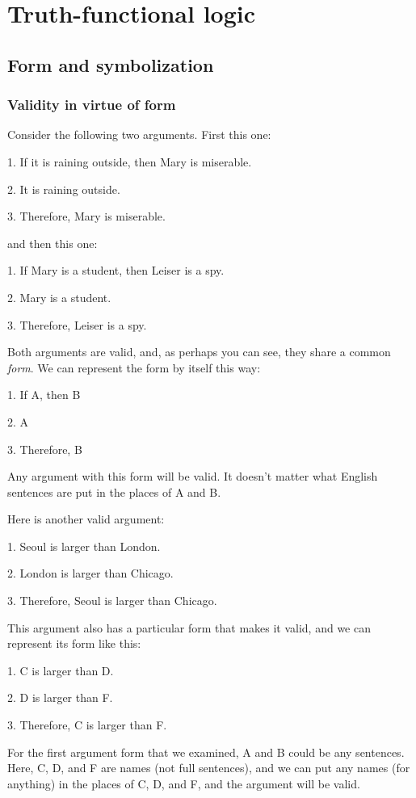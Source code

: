 \part{Truth-functional logic}
\label{ch.TFL}

\chapter{Form and symbolization}\label{symbolization}

\section{Validity in virtue of form}\label{s:ValidityInVirtueOfForm}
Consider the following two arguments. First this one:
	\begin{earg}
		\item[1.] If it is raining outside, then Mary is miserable.
		\item[2.] It is raining outside.
		\item[3.] Therefore, Mary is miserable.
	\end{earg}
and then this one:
	\begin{earg}
		\item[1.] If Mary is a student, then Leiser is a spy.
		\item[2.] Mary is a student.
		\item[3.] Therefore, Leiser is a spy.
	\end{earg}
Both arguments are valid, and, as perhaps you  can see, they share a common \textit{form}. We can represent the form by itself this way:
	\begin{earg}
		\item[1.] If A, then B
		\item[2.] A
		\item[3.] Therefore, B
	\end{earg}
Any argument with this form will be valid. It doesn't matter what English sentences are put in the places of A and B. 

Here is another valid argument:
	\begin{earg}
		\item[1.] Seoul is larger than London.
		\item[2.] London is larger than Chicago.
		\item[3.] Therefore, Seoul is larger than Chicago. 
	\end{earg}
This argument also has a particular form that makes it valid, and we can represent its form like this:
	\begin{earg}
		\item[1.] C is larger than D.
		\item[2.] D is larger than F.
		\item[3.] Therefore, C is larger than F. 
	\end{earg}
For the first argument form that we examined, A and B could be any sentences. Here, C, D, and F are names (not full sentences), and we can put any names (for anything) in the places of C, D, and F, and the argument will be valid.

